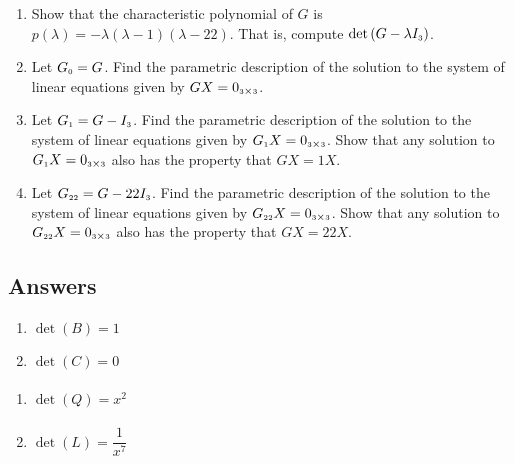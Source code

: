 \begin{enumerate}
\setcounter{enumi}{\value{HW}}

\item Show that the characteristic polynomial of $G$ is $p(\lambda) = -\lambda(\lambda - 1)(\lambda - 22)$.  That is, compute $\text{det}\left(G - \lambda I_{\mbox{\tiny$3$}}\right)$. \label{eigenfirst} 

\item Let $G_{\mbox{\tiny$0$}} = G$.  Find the parametric description of the solution to the system of linear equations given by $GX = 0_{\mbox{\tiny$3$} \times \mbox{\tiny$3$}}$.

\item Let $G_{\mbox{\tiny$1$}} = G - I_{\mbox{\tiny$3$}}$.  Find the parametric description of the solution to the system of linear equations given by $G_{\mbox{\tiny$1$}}X = 0_{\mbox{\tiny$3$} \times \mbox{\tiny$3$}}$.  Show that any solution to $G_{\mbox{\tiny$1$}}X = 0_{\mbox{\tiny$3$} \times \mbox{\tiny$3$}}$ also has the property that $GX = 1X$.

\item Let $G_{\mbox{\tiny$22$}} = G - 22 I_{\mbox{\tiny$3$}}$.  Find the parametric description of the solution to the system of linear equations given by $G_{\mbox{\tiny$22$}}X = 0_{\mbox{\tiny$3$} \times \mbox{\tiny$3$}}$.  Show that any solution to $G_{\mbox{\tiny$22$}}X = 0_{\mbox{\tiny$3$} \times \mbox{\tiny$3$}}$ also has the property that $GX = 22X$. \label{eigenlast}

\end{enumerate}

\newpage

\subsection{Answers}

\begin{multicols}{2}
\begin{enumerate}

\item $\det(B) = 1$
\item $\det(C) = 0$

\setcounter{HW}{\value{enumi}}
\end{enumerate}
\end{multicols}

\begin{multicols}{2}
\begin{enumerate}
\setcounter{enumi}{\value{HW}}

\item $\det(Q) = x^{2} \phantom{\dfrac{1}{x^{7}}}$
\item $\det(L) = \dfrac{1}{x^{7}}$

\setcounter{HW}{\value{enumi}}
\end{enumerate}
\end{multicols}

